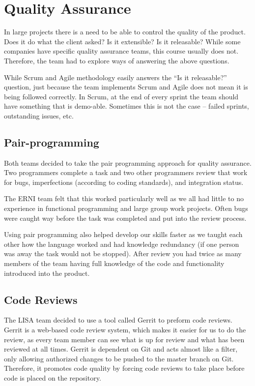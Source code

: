 \section {Quality Assurance}
In large projects there is a need to be able to control the quality of the product. Does it do what the client asked? Is it extensible? Is it releasable? While some companies have specific quality assurance teams, this  course usually does not. Therefore, the team had to explore ways of answering the above questions.

While Scrum and Agile methodology easily answers the ``Is it releasable?'' question, just because the team  implements Scrum and Agile does not mean it is being followed correctly. In Scrum, at the end of every sprint the team should have something that is demo-able. Sometimes this is not the case -- failed sprints, outstanding issues, etc.

\subsection{Pair-programming}

Both teams decided to take the pair programming approach for quality assurance. Two programmers complete a task and two other programmers review that work for bugs, imperfections (according to coding standards), and integration status. 

The ERNI team felt that this worked particularly well as we all had little to no experience in functional programming and large group work projects. Often bugs were caught way before the task was completed and put into the review process. 

Using pair programming also helped develop our skills faster as we taught each other how the language worked and had knowledge redundancy (if one person was away the task would not be stopped). After review you had twice as many members of the team having full knowledge of the code and functionality introduced into the product.

\subsection{Code Reviews}

The LISA team decided to use a tool called Gerrit\cite{gerritsite} to preform code reviews. Gerrit is a web-based code review system, which makes it easier for us to do the review, as every team member can see what is up for review and what has been reviewed at all times. Gerrit is dependent on Git and acts almost like a filter, only allowing authorized changes to be pushed to the master branch on Git. Therefore, it promotes code quality by forcing code reviews to take place before code is placed on the repository.

